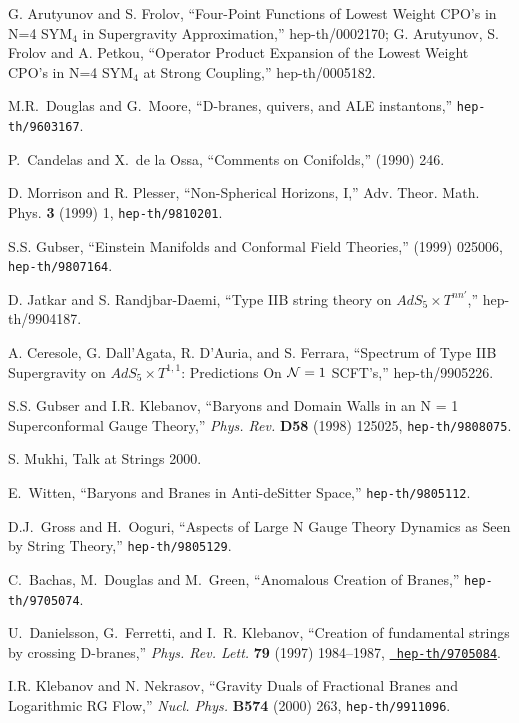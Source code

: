 \documentclass[12pt]{article}
\begin{document}
\begin{thebibliography}{99}

G. Arutyunov and S. Frolov, 
``Four-Point Functions of Lowest Weight CPO's in N=4 SYM$_4$
in Supergravity Approximation,'' hep-th/0002170;
G. Arutyunov, S. Frolov and A. Petkou,
``Operator Product Expansion of the Lowest Weight CPO's 
in N=4 SYM$_4$ at Strong Coupling,'' hep-th/0005182.

M.R.~Douglas and G.~Moore, ``D-branes, quivers, and ALE instantons,''
{{\tt hep-th/9603167}}.

P.~Candelas and X.~de la Ossa, ``Comments on Conifolds,''
 (1990) 246.

D. Morrison and R. Plesser,
``Non-Spherical Horizons, I,''
Adv. Theor. Math. Phys. {\bf 3} (1999) 1,  {\tt hep-th/9810201}.

S.S. Gubser, ``Einstein Manifolds and Conformal Field Theories,''
 (1999) 025006, {{\tt hep-th/9807164}}.

D. Jatkar and S. Randjbar-Daemi,
``Type IIB string theory on $AdS_5 \times T^{nn'}$,''
hep-th/9904187.

A. Ceresole, G. Dall'Agata, R. D'Auria, and S. Ferrara,
``Spectrum of Type IIB Supergravity on $AdS_5\times T^{1,1}$:
Predictions
On ${\cal N}=1$ SCFT's,'' hep-th/9905226.

S.S. Gubser and I.R. Klebanov,
``Baryons and Domain Walls in an N = 1 Superconformal Gauge Theory,''
{\em Phys. Rev.} {\bf D58} (1998) 125025,
{{\tt hep-th/9808075}}.

S. Mukhi, Talk at Strings 2000.

E.~Witten, ``Baryons and Branes in Anti-deSitter Space,''
{{\tt hep-th/9805112}}.

D.J.~Gross and H.~Ooguri, ``Aspects of Large N Gauge Theory Dynamics
as Seen by String Theory,''
{{\tt hep-th/9805129}}.

C.~Bachas, M.~Douglas and M.~Green, ``Anomalous Creation of Branes,''
{{\tt hep-th/9705074}}.

U.~Danielsson, G.~Ferretti, and I.~R. Klebanov, ``Creation of fundamental
  strings by crossing D-branes,'' {\em Phys. Rev. Lett.} {\bf 79} (1997)
  1984--1987, \href{http://xxx.lanl.gov/abs/hep-th/9705084}{{\tt
  hep-th/9705084}}.

I.R. Klebanov and N. Nekrasov, 
``Gravity Duals of Fractional Branes and Logarithmic RG Flow,''
{\em Nucl. Phys.} {\bf B574} (2000) 263,
{\tt hep-th/9911096}.


\end{thebibliography}
\end{document}
